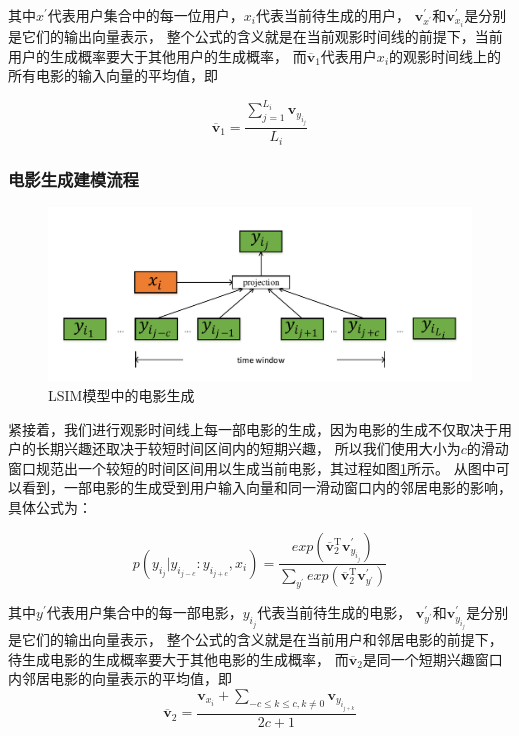 其中$x^{'}$代表用户集合中的每一位用户，$x_i$代表当前待生成的用户，
$\mathbf{v}_{x^{'}}^{'}$和$\mathbf{v}_{x_i}^{'}$是分别是它们的输出向量表示，
整个公式的含义就是在当前观影时间线的前提下，当前用户的生成概率要大于其他用户的生成概率，
而$\overline{\mathbf{v}}_{1}$代表用户$x_i$的观影时间线上的所有电影的输入向量的平均值，即

\begin{equation}
\overline{\mathbf{v}}_{1} = \frac{\sum_{j=1}^{L_i} \mathbf{v}_{y_{i_j}}}{L_i}
\end{equation}

\subsubsection{电影生成建模流程}
\begin{figure}[htbp]
    \centering
    \includegraphics[scale=0.6]{images/doc2vec2.pdf}
    \caption{LSIM模型中的电影生成}
    \label{fig:doc2vec2}
\end{figure}

紧接着，我们进行观影时间线上每一部电影的生成，因为电影的生成不仅取决于用户的长期兴趣还取决于较短时间区间内的短期兴趣，
所以我们使用大小为$c$的滑动窗口规范出一个较短的时间区间用以生成当前电影，其过程如图\ref{fig:doc2vec2}所示。
从图中可以看到，一部电影的生成受到用户输入向量和同一滑动窗口内的邻居电影的影响，具体公式为：

\begin{equation}
p(y_{i_j} | y_{i_{j-c}} : y_{i_{j+c}}, x_i) =
\frac
{
    exp( \overline{\mathbf{v}}_{2}^{\mathrm{T}} \mathbf{v}_{y_{i_j}}^{'} )
}
{
    \sum_{y^{'}} exp( \overline{\mathbf{v}}_{2}^{\mathrm{T}} \mathbf{v}_{y^{'}}^{'} )
}
\end{equation}

其中$y^{'}$代表用户集合中的每一部电影，${y_{i_j}}$代表当前待生成的电影，
$\mathbf{v}_{y^{'}}^{'}$和$\mathbf{v}_{y_{i_j}}^{'}$是分别是它们的输出向量表示，
整个公式的含义就是在当前用户和邻居电影的前提下，待生成电影的生成概率要大于其他电影的生成概率，
而$\overline{\mathbf{v}}_{2}$是同一个短期兴趣窗口内邻居电影的向量表示的平均值，即
\begin{equation}
\overline{\mathbf{v}}_{2} = \frac{
    \mathbf{v}_{x_i} + 
    \sum_{-c \leq k \leq c, k \not= 0}{\mathbf{v}_{y_{i_{j+k}}}}
}{2c+1}
\end{equation}

